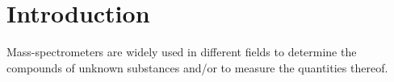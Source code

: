\section{Introduction} \label{sec:introduction}
Mass-spectrometers are widely used in different fields to determine the compounds of unknown substances and/or to measure the quantities thereof. 

